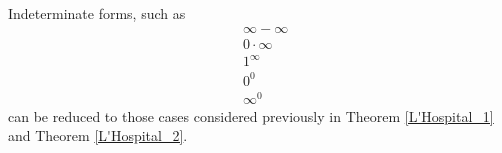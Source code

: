 \begin{note}
Indeterminate forms, such as
\begin{align*}
    &\infty - \infty\\
    &0 \cdot \infty\\
    &1^{\infty}\\
    &0^{0}\\
    &\infty^{0}
\end{align*}
can be reduced to those cases considered previously in Theorem \ref{L'Hospital_1} and Theorem \ref{L'Hospital_2}.
\end{note}